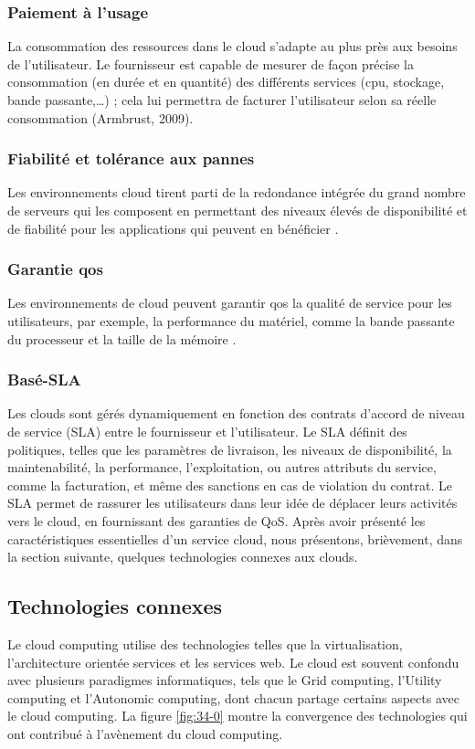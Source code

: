       \subsubsection{Paiement à l’usage}
       La consommation des ressources dans le cloud s’adapte au plus près aux besoins de l’utilisateur. Le fournisseur est capable de mesurer de façon précise la consommation (en durée et en quantité) des différents services (\ac{cpu}, stockage, bande passante,…) ; cela lui permettra de facturer l’utilisateur selon sa réelle consommation (Armbrust, 2009). 
      \subsubsection{Fiabilité et tolérance aux pannes}
       Les environnements cloud tirent parti de la redondance intégrée du grand nombre de serveurs qui les composent en permettant des niveaux élevés de disponibilité et de fiabilité pour les applications qui peuvent en bénéficier \parencite{Buyya}. 
      \subsubsection{Garantie \ac{qos} }
       Les environnements de cloud peuvent garantir \ac{qos} la qualité de service pour les utilisateurs, par exemple, la performance du matériel, comme la bande passante du processeur et la taille de la mémoire \parencite{Wang2008}. 
       
    	  \subsubsection{Basé-SLA}
    	   Les clouds sont gérés dynamiquement en fonction des contrats d’accord de niveau de service (SLA)  \parencite{Buyya} entre le fournisseur et l’utilisateur. Le SLA définit des politiques, telles que les paramètres de livraison, les niveaux de disponibilité, la maintenabilité, la performance, l'exploitation, ou autres attributs du service, comme la facturation, et même des sanctions en cas de violation du contrat. Le SLA permet de rassurer les utilisateurs dans leur idée de déplacer leurs activités vers le cloud, en fournissant des garanties de QoS. 
    	Après avoir présenté les caractéristiques essentielles d’un service cloud, nous présentons, brièvement, dans la section suivante, quelques technologies connexes aux clouds.
    	
 
\subsection{Technologies connexes }
Le cloud computing  utilise des technologies telles que la virtualisation, l'architecture orientée services et les services web. Le cloud est souvent confondu avec plusieurs paradigmes informatiques, tels que le Grid computing, l’Utility computing  et l’Autonomic computing, dont chacun partage certains aspects avec le cloud computing. La figure \ref{fig:34-0} montre la convergence des technologies qui ont contribué à l'avènement du cloud computing. 

